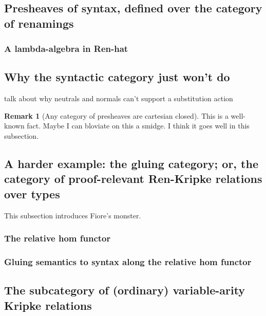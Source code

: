 \documentclass[12pt,twoside]{reedthesis}
\theoremstyle{definition}
\newtheorem{remark}{Remark}
\theoremstyle{remark}
\theoremstyle{plain}
\begin{document}
\subsection{Presheaves of syntax, defined over the category of renamings}

\subsubsection{A lambda-algebra in Ren-hat}

\subsection{Why the syntactic category just won't do}
talk about why neutrals and normals can't support a substitution action
\begin{remark}[Any category of presheaves are cartesian closed]
  This is a well-known fact. Maybe I can bloviate on this a smidge. I think it goes well in this subsection.
\end{remark}

\subsection{A harder example: the gluing category; or, the category of proof-relevant Ren-Kripke relations over types}
This subsection introduces Fiore's monster.
\subsubsection{The relative hom functor}
\subsubsection{Gluing semantics to syntax along the relative hom functor}
\subsection{The subcategory of (ordinary) variable-arity Kripke relations}
\end{document}
